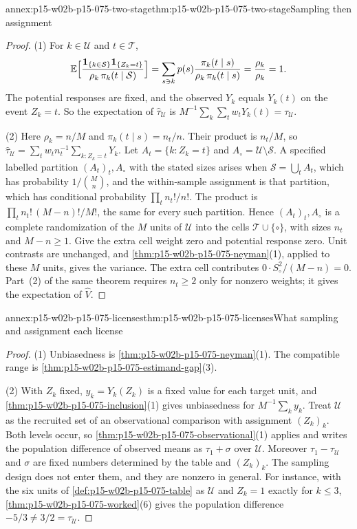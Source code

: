 \begin{annexitem}{annex:p15-w02b-p15-075-two-stage}{thm:p15-w02b-p15-075-two-stage}{Sampling then assignment}
\begin{proof}
(1) For \(k\in\mathcal U\) and \(t\in\mathcal T\),
\[
 \mathbb E\Bigl[\frac{\mathbf1_{\{k\in\mathcal S\}}\mathbf1_{\{Z_k=t\}}}
 {\rho_k\,\pi_k(t\mid\mathcal S)}\Bigr]
 =\sum_{s\ni k}p(s)\frac{\pi_k(t\mid s)}{\rho_k\,\pi_k(t\mid s)}
 =\frac{\rho_k}{\rho_k}=1 .
\]
The potential responses are fixed, and the observed \(Y_k\) equals \(Y_k(t)\)
on the event \(Z_k=t\). So the expectation of
\(\widehat\tau_{\mathcal U}\) is \(M^{-1}\sum_k\sum_tw_tY_k(t)=\tau_{\mathcal U}\).

(2) Here \(\rho_k=n/M\) and \(\pi_k(t\mid s)=n_t/n\). Their product is
\(n_t/M\), so \(\widehat\tau_{\mathcal U}=\sum_tw_tn_t^{-1}\sum_{k:Z_k=t}Y_k\).
Let \(A_t=\{k:Z_k=t\}\) and \(A_\circ=\mathcal U\setminus\mathcal S\). A
specified labelled partition \((A_t)_t,A_\circ\) with the stated sizes arises
when \(\mathcal S=\bigcup_tA_t\), which has probability \(1/\binom Mn\), and
the within-sample assignment is that partition, which has conditional probability
\(\prod_tn_t!/n!\). The product is \(\prod_tn_t!\,(M-n)!/M!\), the same for
every such partition. Hence \((A_t)_t,A_\circ\) is a complete randomization of
the \(M\) units of \(\mathcal U\) into the cells \(\mathcal T\cup\{\circ\}\),
with sizes \(n_t\) and \(M-n\geq1\). Give the extra cell weight zero and
potential response zero. Unit contrasts are unchanged, and
\cref{thm:p15-w02b-p15-075-neyman}(1), applied to these \(M\) units, gives the
variance. The extra cell contributes \(0\cdot S_\circ^2/(M-n)=0\). Part~(2) of
the same theorem requires \(n_t\geq2\) only for nonzero weights; it gives the
expectation of \(\widehat V\).
\end{proof}
\end{annexitem}

\begin{annexitem}{annex:p15-w02b-p15-075-licenses}{thm:p15-w02b-p15-075-licenses}{What sampling and assignment each license}
\begin{proof}
(1) Unbiasedness is \cref{thm:p15-w02b-p15-075-neyman}(1). The compatible
range is \cref{thm:p15-w02b-p15-075-estimand-gap}(3).

(2) With \(Z_k\) fixed, \(y_k=Y_k(Z_k)\) is a fixed value for each target
unit, and \cref{thm:p15-w02b-p15-075-inclusion}(1) gives unbiasedness for
\(M^{-1}\sum_ky_k\). Treat \(\mathcal U\) as the recruited set of an
observational comparison with assignment \((Z_k)_k\). Both levels occur, so
\cref{thm:p15-w02b-p15-075-observational}(1) applies and writes the population
difference of observed means as \(\tau_1+\sigma\) over \(\mathcal U\).
Moreover \(\tau_1-\tau_{\mathcal U}\) and \(\sigma\) are fixed numbers
determined by the table and \((Z_k)_k\). The sampling design does not enter
them, and they are nonzero in general. For instance, with the six units of
\cref{def:p15-w02b-p15-075-table} as \(\mathcal U\) and
\(Z_k=1\) exactly for \(k\leq3\),
\cref{thm:p15-w02b-p15-075-worked}(6) gives the population difference
\(-5/3\neq3/2=\tau_{\mathcal U}\).
\end{proof}
\end{annexitem}

